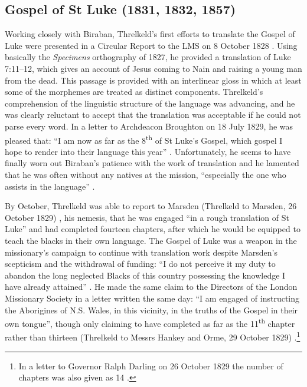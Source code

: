 {\subsection{Gospel of St Luke (1831, 1832, 1857)}

Working closely with Biraban, Threlkeld’s first efforts to translate the Gospel of Luke were presented in a Circular Report to the LMS on 8 October 1828 \citep[100--101]{gunson_australian_1974a}. Using basically the \textit{Specimens} orthography of 1827, he provided a translation of Luke 7:11--12, which gives an account of Jesus coming to Nain and raising a young man from the dead. This passage is provided with an interlinear gloss in which at least some of the morphemes are treated as distinct components. Threlkeld’s comprehension of the linguistic structure of the language was advancing, and he was clearly reluctant to accept that the translation was acceptable if he could not parse every word. In a letter to Archdeacon Broughton on 18 July 1829, he was pleased that: “I am now as far as the 8\textsuperscript{th} of St Luke’s Gospel, which gospel I hope to render into their language this year” \citep[106]{gunson_australian_1974a}. Unfortunately, he seems to have finally worn out Biraban’s patience with the work of translation and he lamented that he was often without any natives at the mission, “especially the one who assists in the language” \citep[106]{gunson_australian_1974a}.

\enlargethispage{\baselineskip}

By October, Threlkeld was able to report to Marsden (Threlkeld to Marsden, 26 October 1829) \citep[106]{gunson_australian_1974a}, his nemesis, that he was engaged “in a rough translation of St Luke” and had completed fourteen chapters, after which he would be equipped to teach the blacks in their own language. The Gospel of Luke was a weapon in the missionary’s campaign to continue with translation work despite Marsden’s scepticism and the withdrawal of funding: “I do not perceive it my duty to abandon the long neglected Blacks of this country possessing the knowledge I have already attained” \citep[107]{gunson_australian_1974a}. He made the same claim to the Directors of the London Missionary Society in a letter written the same day: “I am engaged of instructing the Aborigines of N.S. Wales, in this vicinity, in the truths of the Gospel in their own tongue”, though only claiming to have completed as far as the 11\textsuperscript{th} chapter rather than thirteen (Threlkeld to Messrs Hankey and Orme, 29 October 1829) \citep[107]{gunson_australian_1974a}.\footnote{In a letter to Governor Ralph Darling on 26 October 1829 the number of chapters was also given as 14 \citep[107]{gunson_australian_1974a}.}

}
